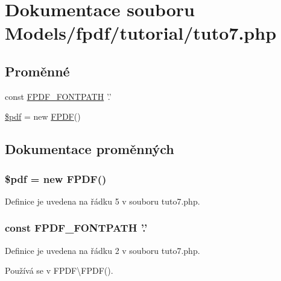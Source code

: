 \hypertarget{tuto7_8php}{\section{Dokumentace souboru Models/fpdf/tutorial/tuto7.php}
\label{tuto7_8php}
}
\subsection*{Proměnné}
\begin{DoxyCompactItemize}
\item 
const \hyperlink{tuto7_8php_a86e0b1cba2d1cbe4c6b667bd776f4b70}{F\-P\-D\-F\-\_\-\-F\-O\-N\-T\-P\-A\-T\-H} '.'
\item 
\hyperlink{tuto7_8php_a964ee5ee597c515cbb4dad2f14054cb4}{\$pdf} = new \hyperlink{class_f_p_d_f}{F\-P\-D\-F}()
\end{DoxyCompactItemize}


\subsection{Dokumentace proměnných}
\hypertarget{tuto7_8php_a964ee5ee597c515cbb4dad2f14054cb4}{
\subsubsection[{\$pdf}]{\setlength{\rightskip}{0pt plus 5cm}\$pdf = new {\bf F\-P\-D\-F}()}}\label{tuto7_8php_a964ee5ee597c515cbb4dad2f14054cb4}


Definice je uvedena na řádku 5 v souboru tuto7.\-php.

\hypertarget{tuto7_8php_a86e0b1cba2d1cbe4c6b667bd776f4b70}{
\subsubsection[{F\-P\-D\-F\-\_\-\-F\-O\-N\-T\-P\-A\-T\-H}]{\setlength{\rightskip}{0pt plus 5cm}const F\-P\-D\-F\-\_\-\-F\-O\-N\-T\-P\-A\-T\-H '.'}}\label{tuto7_8php_a86e0b1cba2d1cbe4c6b667bd776f4b70}


Definice je uvedena na řádku 2 v souboru tuto7.\-php.



Používá se v F\-P\-D\-F\textbackslash{}\-F\-P\-D\-F().

